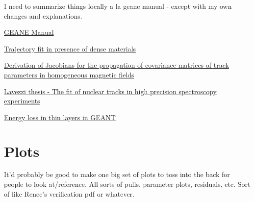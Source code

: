 \documentclass{article}
\begin{document}
  I need to summarize things locally a la geane manual - except with my own changes and explanations.

	\href{http://innocentonnice.web.cern.ch/innocentonnice/napoli99/geane_manual.ps}{GEANE Manual}

	\href{http://www.sciencedirect.com/science/article/pii/016890029390992Q}{Trajectory fit in presence of dense materials}

	\href{http://www.sciencedirect.com/science/article/pii/S0168900206013143}{Derivation of Jacobians for the propagation of covariance matrices of track parameters in homogeneous magnetic fields}

	\href{http://bamboo.pv.infn.it/doc/L_Lavezzi.pdf}{Lavezzi thesis - The fit of nuclear tracks in high precision spectroscopy experiments}

  \href{http://www.sciencedirect.com/science/article/pii/0168900295003444}{Energy loss in thin layers in GEANT}


\section{Plots}

It'd probably be good to make one big set of plots to toss into the back for people to look at/reference. All sorts of pulls, parameter plots, residuals, etc. Sort of like Renee's verification pdf or whatever.
\end{document}
